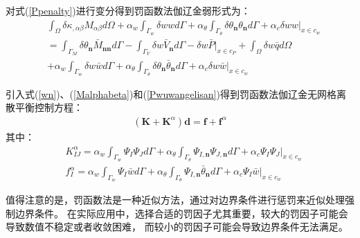 对式(\ref{Ppenalty})进行变分得到罚函数法伽辽金弱形式为：
\begin{equation}
\begin{split}
    &\int_{\Omega}\delta\kappa_{,\alpha\beta}M_{\alpha\beta}d\Omega
    +\alpha_w\int_{\Gamma_w}\delta wwd\Gamma+\alpha_{\theta}\int_{\Gamma_{\theta}}\delta\theta_{\pmb{n}}\theta_{\pmb{n}}d\Gamma+\alpha_c\delta ww\vert_{x\in c_w}\\
    &=\int_{\Gamma_M}\delta\theta_{\pmb{n}}\bar{M}_{\pmb{nn}}d\Gamma-\int_{\Gamma_V}\delta w\bar{V}_{\pmb{n}}d\Gamma-\delta w\bar{P}\vert_{x\in c_P}+\int_{\Omega}\delta w\bar{q}d\Omega\\
    &+\alpha_w\int_{\Gamma_w}\delta w\bar{w}d\Gamma+\alpha_{\theta}\int_{\Gamma_{\theta}}\delta\theta_{\pmb{n}}\bar{\theta}_{\pmb{n}}d\Gamma+\alpha_c\delta w\bar{w}\vert_{x\in c_w}
\end{split}
\end{equation}\par
引入式(\ref{wn})、(\ref{Malphabeta})和(\ref{Pwuwangelisan})得到罚函数法伽辽金无网格离散平衡控制方程：
\begin{equation}
\begin{split}
    (\pmb{K}+\pmb{K}^{\alpha})\pmb{d}=\pmb{f}+\pmb{f}^{\alpha}
\end{split}
\end{equation}
其中：
\begin{equation}
\begin{split}
   &K^{\alpha}_{IJ}=\alpha_w\int_{\Gamma_w}\Psi_I\Psi_Jd\Gamma+\alpha_{\theta}\int_{\Gamma_{\theta}}\Psi_{I,\pmb n}\Psi_{J,\pmb n}d\Gamma+\alpha_c\Psi_I\Psi_J\vert_{x\in c_w}\\
&f^{\alpha}_I=\alpha_w\int_{\Gamma_w}\Psi_I\bar{w}d\Gamma+\alpha_{\theta}\int_{\Gamma_{\theta}}\Psi_{I,\pmb n}\bar{\theta}_{\pmb n}d\Gamma+\alpha_c\Psi_I\bar{w}\vert_{x\in c_w}
\end{split}
\end{equation}\par
值得注意的是，罚函数法是一种近似方法，通过对边界条件进行惩罚来近似处理强制边界条件。
在实际应用中，选择合适的罚因子尤其重要，较大的罚因子可能会导致数值不稳定或者收敛困难，
而较小的罚因子可能会导致边界条件无法满足。
